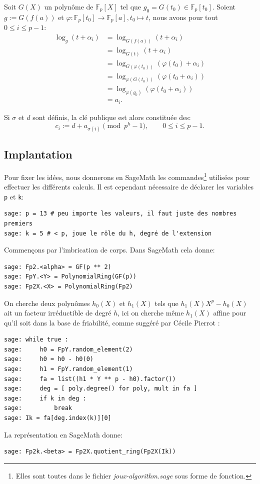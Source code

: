 \documentclass[a4paper, titlepage, 11pt]{article}
\theoremstyle{definition}
\theoremstyle{remark}
\def\gf #1{\mathbb{F}_{#1}}
\begin{document}
Soit $G(X)$ un polynôme de $\gf{p}[X]$ tel que $g_0 = G(t_0) \in \gf{p}[t_0]$. Soient $g := G(f(a))$ et $\varphi: \gf{p}[t_0] \rightarrow \gf{p}[a], t_0 \mapsto t$, nous avons pour tout $0 \leqslant i \leqslant p-1$:
\begin{align*}
\log_{g}({t}+\alpha_i) &= \log_{G(f(a))}(t+\alpha_i)\\
&= \log_{G(t)}(t+\alpha_i) \\
&= \log_{G(\varphi(t_0))}(\varphi(t_0)+\alpha_i) \\
&= \log_{\varphi(G(t_0))}(\varphi(t_0+\alpha_i)) \\
&= \log_{\varphi(g_0)}(\varphi(t_0+\alpha_i)) \\
&= a_i.
\end{align*}

Si $\sigma$ et $d$ sont définis, la clé publique est alors constituée des:
$$c_i := d + a_{\sigma(i)} \pmod{p^h-1}, \qquad 0 \leqslant i \leqslant p-1.$$

\subsection{Implantation}

Pour fixer les idées, nous donnerons en SageMath les commandes\footnote{Elles sont toutes dans le fichier \textit{joux-algorithm.sage} sous forme de fonction.} utilisées pour effectuer les différents calculs. Il est cependant nécessaire de déclarer les variables \verb|p| et \verb|k|:
\begin{verbatim}
sage: p = 13 # peu importe les valeurs, il faut juste des nombres premiers
sage: k = 5 # < p, joue le rôle du h, degré de l'extension
\end{verbatim}

Commençons par l'imbrication de corps. Dans SageMath cela donne:
\begin{verbatim}
sage: Fp2.<alpha> = GF(p ** 2)
sage: FpY.<Y> = PolynomialRing(GF(p))
sage: Fp2X.<X> = PolynomialRing(Fp2)
\end{verbatim}
On cherche deux polynômes $h_0(X)$ et $h_1(X)$ tels que $h_1(X)X^p - h_0(X)$ ait un facteur irréductible de degré $h$, ici on cherche même $h_1(X)$ affine pour qu'il soit dans la base de friabilité, comme suggéré par Cécile Pierrot \cite{pierrot2016}:
\begin{verbatim}
sage: while true :
sage:     h0 = FpY.random_element(2)
sage:     h0 = h0 - h0(0)
sage:     h1 = FpY.random_element(1)
sage:     fa = list((h1 * Y ** p - h0).factor())
sage:     deg = [ poly.degree() for poly, mult in fa ]
sage:     if k in deg :
sage:         break
sage: Ik = fa[deg.index(k)][0]
\end{verbatim}
La représentation en SageMath donne:
\begin{verbatim}
sage: Fp2k.<beta> = Fp2X.quotient_ring(Fp2X(Ik))
\end{verbatim}
\end{document}
